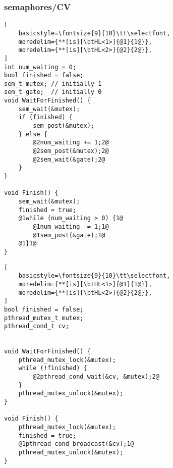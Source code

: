 
\begin{frame}[fragile,label=cvToSem]\frametitle{semaphores/CV}
\begin{minipage}{0.45\textwidth}
\begin{lstlisting}[
    basicstyle=\fontsize{9}{10}\tt\selectfont,
    moredelim={**[is][\btHL<1>]{@1}{1@}},
    moredelim={**[is][\btHL<2>]{@2}{2@}},
]
int num_waiting = 0;
bool finished = false;
sem_t mutex; // initially 1
sem_t gate;  // initially 0
void WaitForFinished() {
    sem_wait(&mutex);
    if (finished) {
        sem_post(&mutex);
    } else {
        @2num_waiting += 1;2@
        @2sem_post(&mutex);2@
        @2sem_wait(&gate);2@
    }
}

void Finish() {
    sem_wait(&mutex);
    finished = true;
    @1while (num_waiting > 0) {1@
        @1num_waiting -= 1;1@
        @1sem_post(&gate);1@
    @1}1@
}
\end{lstlisting}
\end{minipage}
\begin{minipage}{0.45\textwidth}
\begin{lstlisting}[
    basicstyle=\fontsize{9}{10}\tt\selectfont,
    moredelim={**[is][\btHL<1>]{@1}{1@}},
    moredelim={**[is][\btHL<2>]{@2}{2@}},
]
bool finished = false;
pthread_mutex_t mutex;
pthread_cond_t cv;


void WaitForFinished() {
    pthread_mutex_lock(&mutex);
    while (!finished) {
        @2pthread_cond_wait(&cv, &mutex);2@
    }
    pthread_mutex_unlock(&mutex);
}

void Finish() {
    pthread_mutex_lock(&mutex);
    finished = true;
    @1pthread_cond_broadcast(&cv);1@
    pthread_mutex_unlock(&mutex);
}
\end{lstlisting}
\end{minipage}
\end{frame}
